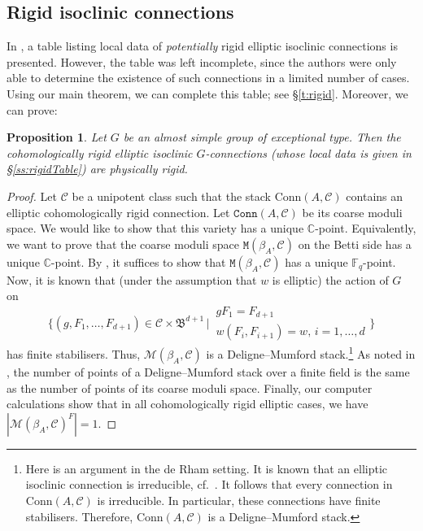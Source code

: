\documentclass[11pt]{amsart}
\newtheorem{prop}[thm]{Proposition}
\theoremstyle{definition}
\newcommand{\bC}{\mathbb{C}}
\newcommand{\fB}{\mathfrak{B}}
\newcommand{\cC}{\mathcal{C}}
\newcommand{\cM}{\mathcal{M}}
\newcommand{\Conn}{\mathrm{Conn}}
\begin{document}
\subsection{Rigid isoclinic connections}\label{ss:rigid}
In \cite[\S 7.9]{JY}, a table listing local data of \emph{potentially} rigid elliptic isoclinic connections is presented. However, the table was left incomplete, since the authors were only able to determine the existence of such connections in a limited number of cases. Using our main theorem, we can complete this table; see \S\ref{t:rigid}. Moreover, we can prove: 

\begin{prop} 
Let $G$ be an almost simple group of exceptional type. Then the cohomologically rigid elliptic isoclinic $G$-connections (whose local data is given in \S\ref{ss:rigidTable}) are physically rigid. 
\end{prop} 

\begin{proof} 
Let $\cC$ be a unipotent class such that the stack $\Conn(A, \cC)$ contains an elliptic cohomologically rigid connection. Let $\mathtt{Conn}(A, \cC)$ be its coarse moduli space. We would like to show that this variety has a unique $\bC$-point. Equivalently, we want to prove that the coarse moduli space  $\mathtt{M}(\beta_A, \cC)$ on the Betti side has a unique $\bC$-point. 
By \cite{KatzAppendix}, it suffices to show that $\mathtt{M}(\beta_A, \cC)$ has a unique $\mathbb{F}_q$-point. 
Now, it is known that (under the assumption that $w$ is elliptic) the action of $G$ on 
\[
\bigg\{
(g,F_1,\dots, F_{d+1})\in \cC\times\fB^{d+1}
\, \bigg|\, 
\substack{
\displaystyle gF_1=F_{d+1}\\[0.1cm]
\displaystyle w(F_i, F_{i+1})=w,\, i=1,\ldots,d  
}
\bigg\}
\]
has finite stabilisers. Thus, $\cM(\beta_A, \cC)$ is a Deligne--Mumford stack.\footnote{Here is an argument in the de Rham setting. It is known that an elliptic isoclinic connection is irreducible, cf.\ \cite[Lemma 17]{Yi}.  It follows that every connection in $\Conn(A, \cC)$  is irreducible. In particular, these connections have finite stabilisers. Therefore, $\Conn(A, \cC)$ is a Deligne--Mumford stack.}  As noted in \cite[\S 2]{stacks}, the number of points of a Deligne--Mumford stack over  a finite field is the same as the number of points of its coarse moduli space. Finally, our computer calculations show that in all cohomologically rigid elliptic cases, we have
$|\cM(\beta_A, \cC)^F|=1$.
\end{proof} 
\end{document}
